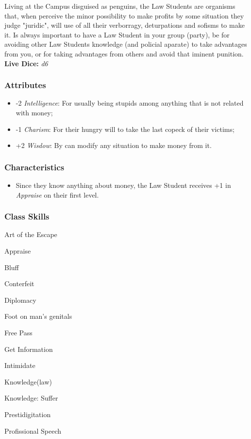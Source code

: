 \documentclass[ letterpaper,12pt]{article}
\begin{document}
Living at the Campus disguised as penguins, the Law Students are organisms
that, when perceive the minor possibility to make profits by some situation
they judge "juridic", will use of all their verborragy, deturpations and
sofisms to make it. Is always important to have a Law Student in your group
(party), be for avoiding other Law Students knowledge (and policial aparate) to
take advantages from you, or for taking advantages from others and avoid that
iminent punition.\\

{\bf Live Dice:} {\it d6}

\subsubsection{Attributes}
\begin{itemize}
\item{-2 {\it Intelligence}: For usually being stupids among anything that is not related with money;}
\item{-1 {\it Charism}: For their hungry will to take the last copeck of their victims;}
\item{+2 {\it Wisdow}: By can modify any situation to make money from it.}
\end{itemize}

\subsubsection{Characteristics}

\begin{itemize}
\item{Since they know anything about money, the Law Student receives +1 in {\it Appraise} on their first level.}
\end{itemize}

\subsubsection{Class Skills}
\begin{itemize}
{\it
\item{Art of the Escape}
\item{Appraise}
\item{Bluff}
\item{Conterfeit}
\item{Diplomacy}
\item{Foot on man's genitals}
\item{Free Pass}
\item{Get Information}
\item{Intimidate}
\item{Knowledge(law)}
\item{Knowledge: Suffer}
\item{Prestidigitation}
\item{Profissional Speech}
}
\end{itemize}
\end{document}
